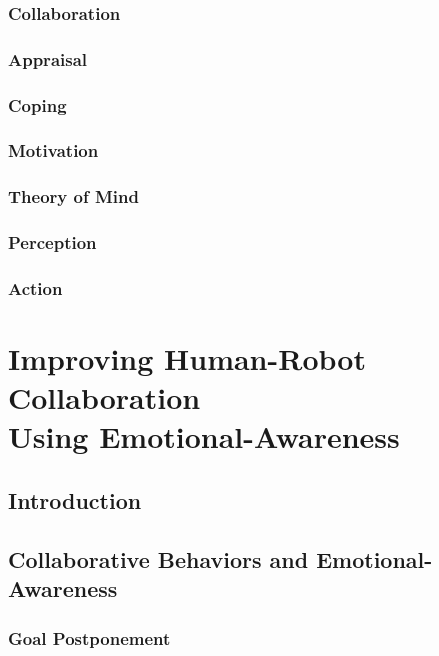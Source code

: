 \documentclass[12pt]{report}
\begin{document}
\subsection{Collaboration}

\subsection{Appraisal}

\subsection{Coping}

\subsection{Motivation}

\subsection{Theory of Mind}

\subsection{Perception}

\subsection{Action}

\chapter{Improving Human-Robot Collaboration \\ Using Emotional-Awareness}
\label{ch:awareness}

\section{Introduction}

\section{Collaborative Behaviors and Emotional-Awareness}

\subsection{Goal Postponement}
\end{document}

